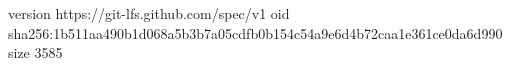 version https://git-lfs.github.com/spec/v1
oid sha256:1b511aa490b1d068a5b3b7a05cdfb0b154c54a9e6d4b72caa1e361ce0da6d990
size 3585
